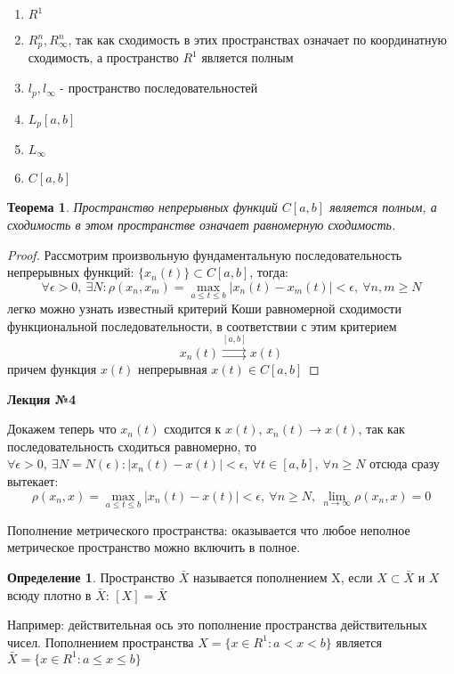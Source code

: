 \documentclass[14pt,a4paper]{extarticle}
\newtheorem{theorem}{Теорема}[section]
\theoremstyle{definition}
\newtheorem{definition}{Определение}[section]
\theoremstyle{remark}
\renewcommand{\[}{\begin{dmath*}[compact]}
\renewcommand{\]}{\end{dmath*}}
\newcommand{\sep}{ , \ \allowbreak }
\begin{document}
\begin{enumerate}
  \item $R^1$
  \item $R_p^n, R_\infty^n$, так как сходимость в этих пространствах означает
  по координатную сходимость, а пространство $R^1$ является полным
  \item $l_p, l_\infty$ - пространство последовательностей %
  \item $L_p[a,b]$ %
  \item $L_\infty$ %
  \item $C[a,b]$
\end{enumerate}

\begin{theorem}
  Пространство непрерывных функций $C[a,b]$ является полным,
  а сходимость в этом пространстве означает равномерную сходимость.
\end{theorem}

\begin{proof}
  Рассмотрим произвольную фундаментальную последовательность
  непрерывных функций: $\{x_n(t)\} \subset C[a, b]$, тогда:
  \[ \forall \epsilon > 0 \sep \exists N: \rho(x_n, x_m) =
  \max_{a \leq t \leq b} |x_n(t) - x_m(t)| < \epsilon \sep
  {\forall n, m \geq N} \]
  легко можно узнать известный критерий Коши равномерной сходимости
  функциональной последовательности, в соответствии с этим критерием
  \[ x_n(t) \overset{[a,b]}{\rightrightarrows} x(t)\]
  причем функция $x(t)$ непрерывная $x(t)\in C[a,b]$
\end{proof}

\textbf{Лекция №4}

Докажем теперь что $x_n(t)$ сходится к $x(t)$, $x_n(t) \to x(t)$,
так как последовательность сходиться равномерно, то
$ \forall \epsilon > 0 \sep \exists N = N(\epsilon): |x_n(t) - x(t)| <
\epsilon \sep \forall t \in [a,b] \sep \forall n \geq N$
отсюда сразу вытекает:
\[ \rho(x_n, x) = \max_{a \leq t \leq b} |x_n(t) - x(t)| < \epsilon \sep
{\forall n \geq N} \sep {\lim_{n \to \infty} \rho(x_n,x) = 0}\]

Пополнение метрического пространства: оказывается что любое неполное
метрическое пространство можно включить в полное.

\begin{definition}
  Пространство $\bar X$ называется пополнением X, если $X \subset \bar{X}$ и $X$
  всюду плотно в $\bar X$: $[X] = \bar X$
\end{definition}

Например: действительная ось это пополнение пространства действительных чисел.
Пополнением пространства $X = \{x \in R^1: a < x < b\}$ является
$\bar{X} = \{x \in R^1: a \leq x \leq b\}$
\end{document}
